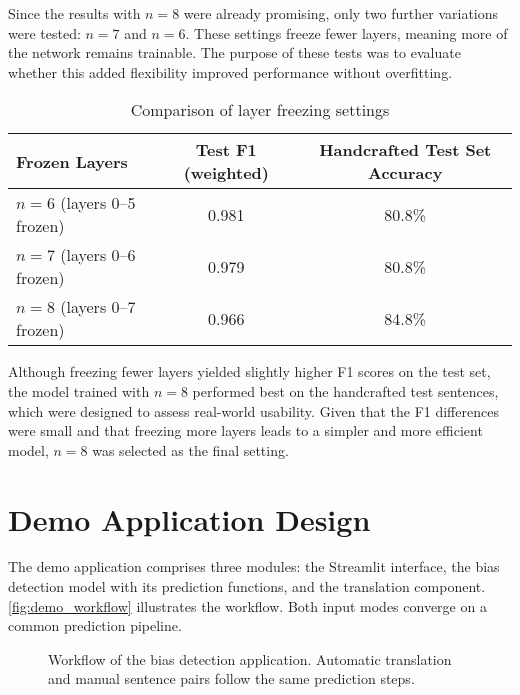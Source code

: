     Since the results with $n=8$ were already promising, only two further variations were tested: $n=7$ and $n=6$. These settings freeze fewer layers, meaning more of the network remains trainable. The purpose of these tests was to evaluate whether this added flexibility improved performance without overfitting.

    \vspace{0.8em}
    \begin{table}[ht]
        \centering
        \begin{tabularx}{\linewidth}{Xcc}
        \toprule
        \textbf{Frozen Layers} & \textbf{Test F1 (weighted)} & \textbf{Handcrafted Test Set Accuracy} \\
        \midrule
        $n=6$ (layers 0--5 frozen) & 0.981 & 80.8\% \\
        $n=7$ (layers 0--6 frozen) & 0.979 & 80.8\% \\
        $n=8$ (layers 0--7 frozen) & 0.966 & 84.8\% \\
        \bottomrule
        \end{tabularx}
        \caption{Comparison of layer freezing settings}
    \end{table}

    Although freezing fewer layers yielded slightly higher F1 scores on the test set, the model trained with $n=8$ performed best on the handcrafted test sentences, which were designed to assess real-world usability. Given that the F1 differences were small and that freezing more layers leads to a simpler and more efficient model, $n=8$ was selected as the final setting.

\section{Demo Application Design}

The demo application comprises three modules: the Streamlit interface, the bias detection model with its prediction functions, and the translation component. \autoref{fig:demo_workflow} illustrates the workflow. Both input modes converge on a common prediction pipeline.

\begin{figure}[htb]
    \centering
    \scalebox{0.8}{}
    \caption{Workflow of the bias detection application. Automatic translation and manual sentence pairs follow the same prediction steps.}
    \label{fig:demo_workflow}
\end{figure}

